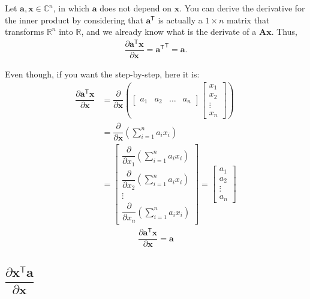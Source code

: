 \documentclass{article}
\newcommand{\trans}{\mathsf{T}}
\begin{document}
Let \(\mathbf{a, x} \in \mathbb{C}^{n}\), in which \(\mathbf{a}\) does not depend on \(\mathbf{x}\). You can derive the derivative for the inner product by considering that \(\mathbf{a}^\trans\) is actually a \(1\times n\) matrix that transforms \(\mathbb{R}^{n}\) into \(\mathbb{R}\), and we already know what is the derivate of a \(\mathbf{Ax}\). Thus,
\begin{align}
    \dfrac{\partial \mathbf{a}^\trans \mathbf{x}}{\partial \mathbf{x}} = {\mathbf{a}^\trans}^\trans = \mathbf{a}.
\end{align}

Even though, if you want the step-by-step, here it is:
\begin{align}
    \dfrac{\partial \mathbf{a}^\trans \mathbf{x}}{\partial \mathbf{x}} &= \dfrac{\partial}{\partial \mathbf{x}} \left(
    \begin{bmatrix}
        a_1 & a_2 & \dots & a_n
    \end{bmatrix} \begin{bmatrix}
        x_{1} \\ x_{2} \\ \vdots \\ x_{n}
    \end{bmatrix} \right) \\
    & = \dfrac{\partial}{\partial \mathbf{x}} \left( \sum_{i = 1}^n a_ix_i \right) \\
    & = \begin{bmatrix}
        \dfrac{\partial}{\partial x_1} \left( \sum_{i = 1}^n a_ix_i \right) \\ \dfrac{\partial}{\partial x_2} \left( \sum_{i = 1}^n a_ix_i \right) \\ \vdots \\ \dfrac{\partial}{\partial x_n} \left( \sum_{i = 1}^n a_ix_i \right) 
    \end{bmatrix} = \begin{bmatrix}
        a_1 \\ a_2 \\ \vdots \\ a_n
    \end{bmatrix}
\end{align}
\begin{align}
    \boxed{\dfrac{\partial \mathbf{a}^\trans \mathbf{x}}{\partial \mathbf{x}} = \mathbf{a}}
\end{align}

\subsection{\(\dfrac{\partial \mathbf{x}^\trans  \mathbf{a}}{\partial \mathbf{x}}\)}
\end{document}

